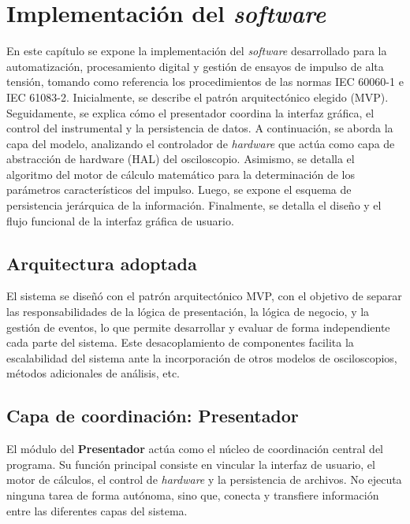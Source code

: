 \newpage
\chapter{Implementación del \emph{software}}
\vspace{3\baselineskip}

En este capítulo se expone la implementación del \emph{software} desarrollado para la automatización, procesamiento digital y gestión de ensayos de impulso de alta tensión, tomando como referencia los procedimientos de las normas IEC 60060-1 e IEC 61083-2. Inicialmente, se describe el patrón arquitectónico elegido (MVP). Seguidamente, se explica cómo el presentador coordina la interfaz gráfica, el control del instrumental y la persistencia de datos. A continuación, se aborda la capa del modelo, analizando el controlador de \emph{hardware} que actúa como capa de abstracción de hardware (HAL) del osciloscopio. Asimismo, se detalla el algoritmo del motor de cálculo matemático para la determinación de los parámetros característicos del impulso. Luego, se expone el esquema de persistencia jerárquica de la información. Finalmente, se detalla el diseño y el flujo funcional de la interfaz gráfica de usuario.

\section{Arquitectura adoptada}
\label{sec:arquitectura_adoptada}
\vspace{3\baselineskip}

El sistema se diseñó con el patrón arquitectónico MVP, con el objetivo de separar las responsabilidades de la lógica de presentación, la lógica de negocio, y la gestión de eventos, lo que permite desarrollar y evaluar de forma independiente cada parte del sistema. Este desacoplamiento de componentes facilita la escalabilidad del sistema ante la incorporación de otros modelos de osciloscopios, métodos adicionales de análisis, etc.

\section{Capa de coordinación: Presentador}
\label{sec:capa_presentador}
\vspace{3\baselineskip}

El módulo del \textbf{Presentador} actúa como el núcleo de coordinación central del programa. Su función principal consiste en vincular la interfaz de usuario, el motor de cálculos, el control de \emph{hardware} y la persistencia de archivos. No ejecuta ninguna tarea de forma autónoma, sino que, conecta y transfiere información entre las diferentes capas del sistema.


